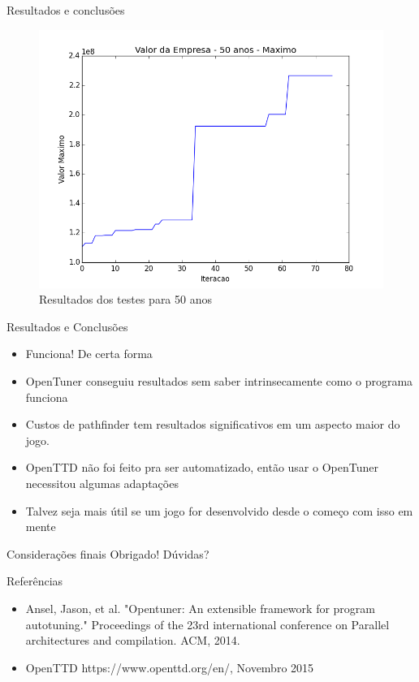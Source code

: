 \documentclass[10pt]{beamer}
\begin{document}
\begin{frame}{Resultados e conclusões}
	\begin{figure}
		\centering
		\includegraphics[width=1\linewidth]{value-50yrs-best}
		\caption{Resultados dos testes para 50 anos}
		\label{fig:value-50yrs-best}
	\end{figure}
	
\end{frame}

\begin{frame}{Resultados e Conclusões}
	\begin{itemize}
	\item Funciona! \pause De certa forma\pause\\
	\item OpenTuner conseguiu resultados sem saber intrinsecamente como o programa funciona\pause \\
	\item Custos de pathfinder tem resultados significativos em um aspecto maior do jogo.\pause\\
	\item OpenTTD não foi feito pra ser automatizado, então usar o OpenTuner necessitou algumas adaptações\pause\\
	\item Talvez seja mais útil se um jogo for desenvolvido desde o começo com isso em mente
	\end{itemize}
\end{frame}

\begin{frame}{Considerações finais}
	Obrigado! Dúvidas?
\end{frame}

\begin{frame}{Referências}
	\begin{itemize}
		\item Ansel, Jason, et al. "Opentuner: An extensible framework for program autotuning." Proceedings of the 23rd international conference on Parallel architectures and compilation. ACM, 2014.
		\item OpenTTD https://www.openttd.org/en/, Novembro 2015
	\end{itemize}
\end{frame}
\end{document}
